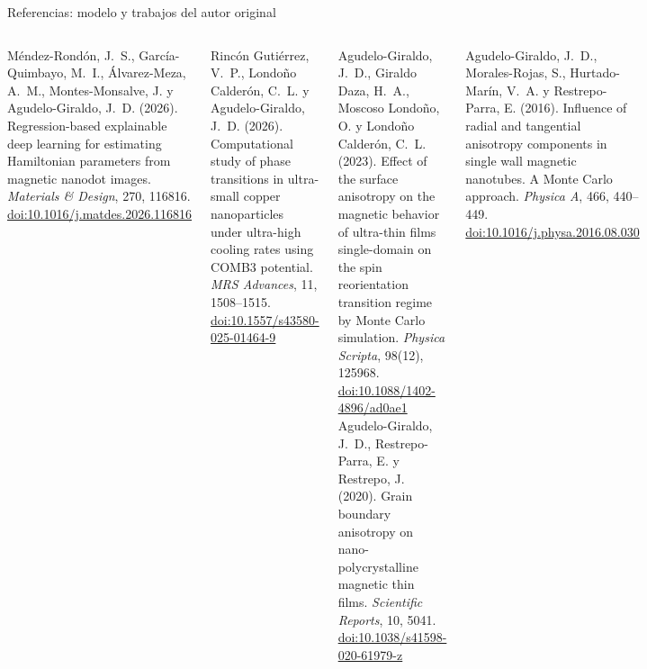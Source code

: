 \documentclass[aspectratio=169,10pt]{beamer}
\begin{document}
\begin{frame}{Referencias: modelo y trabajos del autor original}
\fontsize{7.5}{9}\selectfont
\begin{columns}[T,onlytextwidth]
Méndez-Rondón, J.~S., García-Quimbayo, M.~I., Álvarez-Meza, A.~M., Montes-Monsalve, J. y Agudelo-Giraldo, J.~D. (2026). Regression-based explainable deep learning for estimating Hamiltonian parameters from magnetic nanodot images. \emph{Materials \& Design}, 270, 116816. \href{https://doi.org/10.1016/j.matdes.2026.116816}{doi:10.1016/j.matdes.2026.116816}\par\smallskip
Rincón Gutiérrez, V.~P., Londoño Calderón, C.~L. y Agudelo-Giraldo, J.~D. (2026). Computational study of phase transitions in ultra-small copper nanoparticles under ultra-high cooling rates using COMB3 potential. \emph{MRS Advances}, 11, 1508--1515. \href{https://doi.org/10.1557/s43580-025-01464-9}{doi:10.1557/s43580-025-01464-9}\par\smallskip
Agudelo-Giraldo, J.~D., Giraldo Daza, H.~A., Moscoso Londoño, O. y Londoño Calderón, C.~L. (2023). Effect of the surface anisotropy on the magnetic behavior of ultra-thin films single-domain on the spin reorientation transition regime by Monte Carlo simulation. \emph{Physica Scripta}, 98(12), 125968. \href{https://doi.org/10.1088/1402-4896/ad0ae1}{doi:10.1088/1402-4896/ad0ae1}
Agudelo-Giraldo, J.~D., Restrepo-Parra, E. y Restrepo, J. (2020). Grain boundary anisotropy on nano-polycrystalline magnetic thin films. \emph{Scientific Reports}, 10, 5041. \href{https://doi.org/10.1038/s41598-020-61979-z}{doi:10.1038/s41598-020-61979-z}\par\smallskip
Agudelo-Giraldo, J.~D., Morales-Rojas, S., Hurtado-Marín, V.~A. y Restrepo-Parra, E. (2016). Influence of radial and tangential anisotropy components in single wall magnetic nanotubes. A Monte Carlo approach. \emph{Physica A}, 466, 440--449. \href{https://doi.org/10.1016/j.physa.2016.08.030}{doi:10.1016/j.physa.2016.08.030}
\end{columns}
\end{frame}
\end{document}
